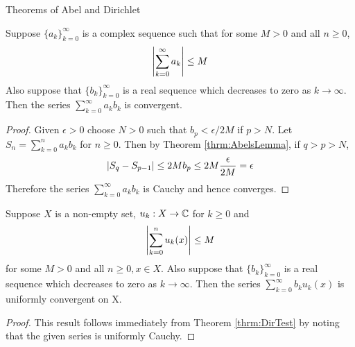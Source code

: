 \begin{section}{Theorems of Abel and Dirichlet}

\begin{thrm}\label{thrm:DirTest}
	Suppose $\{a_k\}_{k=0}^\infty$ is a complex sequence such that
	for some $M > 0$ and all $n \geq 0$,
		\begin{displaymath}
			\left \vert {\sum_{k=0}^\infty a_k} \right \vert \leq M
		\end{displaymath}
	Also suppose that $\{b_k\}_{k=0}^\infty$ is a real sequence
	which decreases to zero as $k \rightarrow \infty$. Then
	the series $\sum_{k=0}^\infty a_k b_k$ is convergent.
\end{thrm}

\begin{proof}
	Given $\epsilon > 0$ choose $N > 0$ such that $b_p < 
	\epsilon/{2M}$ if $p > N$. Let $S_n = \sum_{k=0}^n a_k b_k$
	for $n \geq 0$. Then by Theorem \ref{thrm:AbelsLemma}, if
	$q > p > N$,
		\begin{displaymath}
			\left \vert {S_q - S_{p-1}} \right \vert \leq 2M b_p
				\leq 2M \frac{\epsilon}{2M} = \epsilon
		\end{displaymath}
	Therefore the series $\sum_{k=0}^\infty a_k b_k$ is Cauchy
	and hence converges.
\end{proof}


\begin{thrm}
	\label{thrm:DirTestUniConv}
	Suppose $X$ is a non-empty set, $u_k:X \rightarrow \mathbb{C}$
	for $k \geq 0$ and
		\begin{displaymath}
			\left \vert {\sum_{k=0}^n u_k(x)} \right \vert \leq M
		\end{displaymath}
	for some $M > 0$ and all $n \geq 0, x \in X$. Also suppose that
	$\{b_k\}_{k=0}^\infty$ is a real sequence which decreases
	to zero as $k \rightarrow \infty$. Then	the series 
	$\sum_{k=0}^\infty b_k u_k(x)$ is uniformly convergent on X.
\end{thrm}

\begin{proof}
	This result follows immediately from Theorem \ref{thrm:DirTest}
	by noting that the given series is uniformly Cauchy.
\end{proof}



\end{section}
